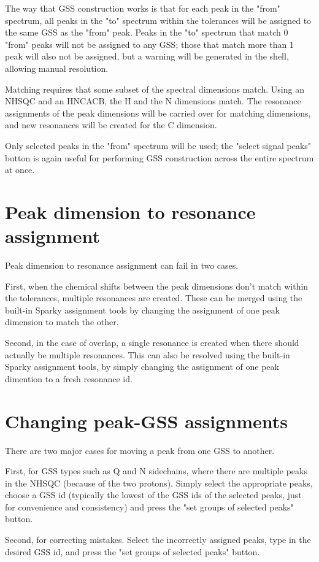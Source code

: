 \documentclass[11pt,a4paper]{article}
\begin{document}
The way that GSS construction works is that for each peak in the "from"
spectrum, all peaks in the "to" spectrum within the tolerances will be
assigned to the same GSS as the "from" peak.  Peaks in the "to" spectrum that
match 0 "from" peaks will not be assigned to any GSS; those that match more
than 1 peak will also not be assigned, but a warning will be generated in
the shell, allowing manual resolution.

Matching requires that some subset of the spectral dimensions match.  Using
an NHSQC and an HNCACB, the H and the N dimensions match.  The resonance
assignments of the peak dimensions will be carried over for matching dimensions,
and new resonances will be created for the C dimension.

Only selected peaks in the "from" spectrum will be used; the "select signal 
peaks" button is again useful for performing GSS construction across the
entire spectrum at once.


\section{Peak dimension to resonance assignment}
Peak dimension to resonance assignment can fail in two cases.

First, when the chemical shifts between the peak dimensions don't match
within the tolerances, multiple resonances are created.  These can be merged
using the built-in Sparky assignment tools by changing the assignment of one
peak dimension to match the other.

Second, in the case of overlap, a single resonance is created when there
should actually be multiple resonances.  This can also be resolved using
the built-in Sparky assignment tools, by simply changing the assignment of
one peak dimention to a fresh resonance id.


\section{Changing peak-GSS assignments}
There are two major cases for moving a peak from one GSS to another.

First, for GSS types such as Q and N sidechains, where there are multiple
peaks in the NHSQC (because of the two protons).  Simply select the appropriate
peaks, choose a GSS id (typically the lowest of the GSS ids of the selected
peaks, just for convenience and consistency) and press the "set groups of
selected peaks" button.

Second, for correcting mistakes.  Select the incorrectly assigned peaks,
type in the desired GSS id, and press the "set groups of selected peaks" button.
\end{document}
